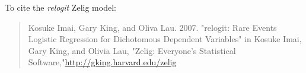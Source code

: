 To cite the \emph{ relogit } Zelig model:
 \begin{verse}
 Kosuke Imai, Gary King, and Oliva Lau. 2007. "relogit: Rare Events Logistic Regression for Dichotomous Dependent Variables" in Kosuke Imai, Gary King, and Olivia Lau, "Zelig: Everyone's Statistical Software,"\url{http://gking.harvard.edu/zelig} 
\end{verse}